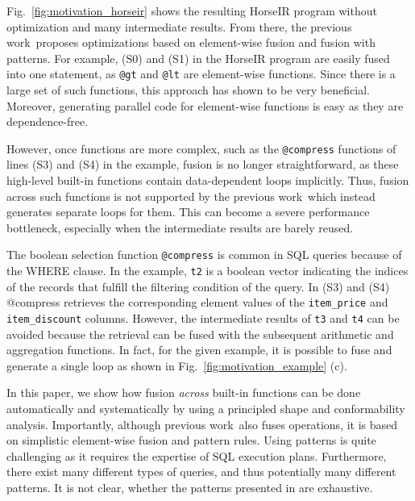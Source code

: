Fig.~\ref{fig:motivation_horseir} shows the resulting HorseIR program without
optimization and many intermediate results. From there, the previous
work~\OldPaper proposes optimizations based on element-wise fusion and fusion
with patterns. For example, (S0) and (S1) in the HorseIR program are easily
fused into one statement, as \texttt{@gt} and \texttt{@lt} are element-wise
functions. Since there is a large set of such functions, this approach has
shown to be very beneficial. 
Moreover, generating parallel code for element-wise functions is easy as they
are dependence-free.


However, once functions are more complex, such as the \texttt{@compress}
functions of lines (S3) and (S4) in the example, fusion is no longer
straightforward, as these high-level built-in functions contain data-dependent
loops implicitly. 
Thus, fusion across such functions is not supported by the previous
work~\OldPaper which instead generates separate loops for them.
This can become a severe performance bottleneck, especially when the
intermediate results are barely reused. 

The boolean selection function \texttt{@compress} is common in SQL queries
because of the WHERE clause.
In the example, \texttt{t2} is a boolean vector indicating the indices of the
records that fulfill the filtering condition of the query. In (S3) and (S4)
@compress retrieves the corresponding element values of the
\texttt{item\_price} and \texttt{item\_discount} columns.
However, the intermediate results of \texttt{t3} and \texttt{t4} can be avoided
because the retrieval can be fused with the subsequent arithmetic and
aggregation functions. In fact, for the given example, it is possible to fuse and
generate a single loop as shown in Fig.~\ref{fig:motivation_example} (c).

In this paper, we show how fusion \textit{across} built-in functions can be
done automatically and systematically by using a principled shape and
conformability analysis. Importantly, although previous work~\OldPaper also fuses
operations, it is based on simplistic element-wise fusion and pattern rules. Using
patterns is quite challenging as it requires the expertise of SQL execution plans.
Furthermore, there exist many different types of queries, and thus potentially many
different patterns. It is not clear, whether the patterns presented in \OldPaper are
exhaustive. 